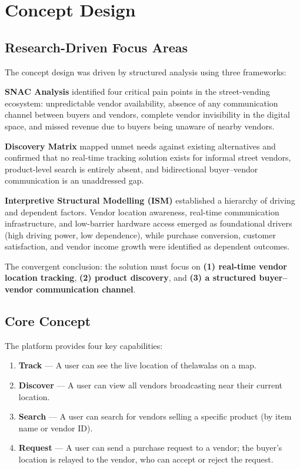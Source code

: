 \documentclass[12pt, a4paper]{article}
\begin{document}
\section{Concept Design}

\subsection{Research-Driven Focus Areas}

The concept design was driven by structured analysis using three frameworks:

\textbf{SNAC Analysis} identified four critical pain points in the street-vending ecosystem: unpredictable vendor availability, absence of any communication channel between buyers and vendors, complete vendor invisibility in the digital space, and missed revenue due to buyers being unaware of nearby vendors.

\textbf{Discovery Matrix} mapped unmet needs against existing alternatives and confirmed that no real-time tracking solution exists for informal street vendors, product-level search is entirely absent, and bidirectional buyer--vendor communication is an unaddressed gap.

\textbf{Interpretive Structural Modelling (ISM)} established a hierarchy of driving and dependent factors. Vendor location awareness, real-time communication infrastructure, and low-barrier hardware access emerged as foundational drivers (high driving power, low dependence), while purchase conversion, customer satisfaction, and vendor income growth were identified as dependent outcomes.

The convergent conclusion: the solution must focus on \textbf{(1) real-time vendor location tracking}, \textbf{(2) product discovery}, and \textbf{(3) a structured buyer--vendor communication channel}.

\subsection{Core Concept}

The platform provides four key capabilities:

\begin{enumerate}[noitemsep]
    \item \textbf{Track} --- A user can see the live location of thelawalas on a map.
    \item \textbf{Discover} --- A user can view all vendors broadcasting near their current location.
    \item \textbf{Search} --- A user can search for vendors selling a specific product (by item name or vendor ID).
    \item \textbf{Request} --- A user can send a purchase request to a vendor; the buyer's location is relayed to the vendor, who can accept or reject the request.
\end{enumerate}
\end{document}
